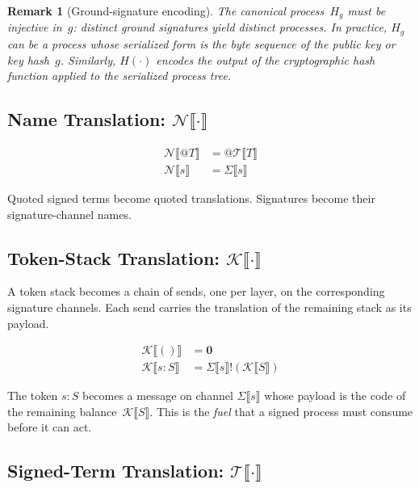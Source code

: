 \documentclass[11pt,a4paper]{article}
\makeatletter
\newtheorem{remark}[theorem]{Remark}
\newcommand{\lsem}{\llbracket}
\newcommand{\rsem}{\rrbracket}
\newcommand{\send}[2]{#1 !\!\left( #2 \right)}
\newcommand{\nil}{\mathbf{0}}
\newcommand{\quot}[1]{@#1}
\makeatother
\begin{document}
\begin{remark}[Ground-signature encoding]
  The canonical process~$H_g$ must be injective in~$g$: distinct
  ground signatures yield distinct processes.  In practice, $H_g$
  can be a process whose serialized form is the byte sequence of
  the public key or key hash~$g$.  Similarly, $H(\cdot)$ encodes
  the output of the cryptographic hash function applied to the
  serialized process tree.
\end{remark}

\subsection{Name Translation: $\mathcal{N}\lsem\cdot\rsem$}
\label{app:name-trans}

\begin{align}
  \mathcal{N}\lsem \quot{T} \rsem
    &= \quot{\mathcal{T}\lsem T \rsem}
    \label{eq:app-name-quote}
  \\[4pt]
  \mathcal{N}\lsem s \rsem
    &= \Sigma\lsem s \rsem
    \label{eq:app-name-sig}
\end{align}

\noindent
Quoted signed terms become quoted translations.  Signatures
become their signature-channel names.

\subsection{Token-Stack Translation: $\mathcal{K}\lsem\cdot\rsem$}
\label{app:token-trans}

A token stack becomes a chain of sends, one per layer, on the
corresponding signature channels.  Each send carries the
translation of the remaining stack as its payload.

\begin{align}
  \mathcal{K}\lsem () \rsem
    &= \nil
    \label{eq:app-tok-empty}
  \\[4pt]
  \mathcal{K}\lsem s : S \rsem
    &= \send{\Sigma\lsem s \rsem}{\mathcal{K}\lsem S \rsem}
    \label{eq:app-tok-cons}
\end{align}

\noindent
The token $s : S$ becomes a message on channel
$\Sigma\lsem s \rsem$ whose payload is the code of the
remaining balance~$\mathcal{K}\lsem S \rsem$.  This is the
\emph{fuel} that a signed process must consume before it can
act.

\subsection{Signed-Term Translation: $\mathcal{T}\lsem\cdot\rsem$}
\label{app:signed-trans}
\end{document}
